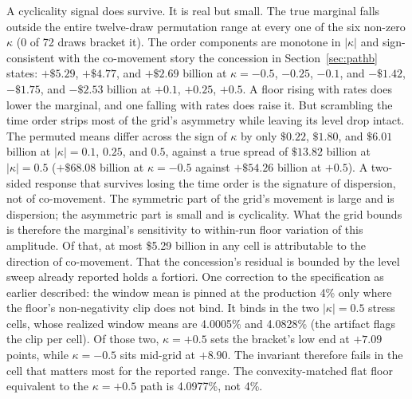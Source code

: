 \documentclass[12pt]{article}
\begin{document}
A cyclicality signal does survive. It is real but small. The true marginal falls outside the entire twelve-draw permutation range at every one of the six non-zero $\kappa$ (0 of 72 draws bracket it). The order components are monotone in $|\kappa|$ and sign-consistent with the co-movement story the concession in Section~\ref{sec:pathb} states: $+\$5.29$, $+\$4.77$, and $+\$2.69$ billion at $\kappa = -0.5$, $-0.25$, $-0.1$, and $-\$1.42$, $-\$1.75$, and $-\$2.53$ billion at $+0.1$, $+0.25$, $+0.5$. A floor rising with rates does lower the marginal, and one falling with rates does raise it. But scrambling the time order strips most of the grid's asymmetry while leaving its level drop intact. The permuted means differ across the sign of $\kappa$ by only $\$0.22$, $\$1.80$, and $\$6.01$ billion at $|\kappa| = 0.1$, $0.25$, and $0.5$, against a true spread of $\$13.82$ billion at $|\kappa| = 0.5$ ($+\$68.08$ billion at $\kappa = -0.5$ against $+\$54.26$ billion at $+0.5$). A two-sided response that survives losing the time order is the signature of dispersion, not of co-movement. The symmetric part of the grid's movement is large and is dispersion; the asymmetric part is small and is cyclicality. What the grid bounds is therefore the marginal's sensitivity to within-run floor variation of this amplitude. Of that, at most \$5.29 billion in any cell is attributable to the direction of co-movement. That the concession's residual is bounded by the level sweep already reported holds a fortiori. One correction to the specification as earlier described: the window mean is pinned at the production 4\% only where the floor's non-negativity clip does not bind. It binds in the two $|\kappa| = 0.5$ stress cells, whose realized window means are 4.0005\% and 4.0828\% (the artifact flags the clip per cell). Of those two, $\kappa = +0.5$ sets the bracket's low end at $+7.09$ points, while $\kappa = -0.5$ sits mid-grid at $+8.90$. The invariant therefore fails in the cell that matters most for the reported range. The convexity-matched flat floor equivalent to the $\kappa = +0.5$ path is 4.0977\%, not 4\%.
\end{document}
